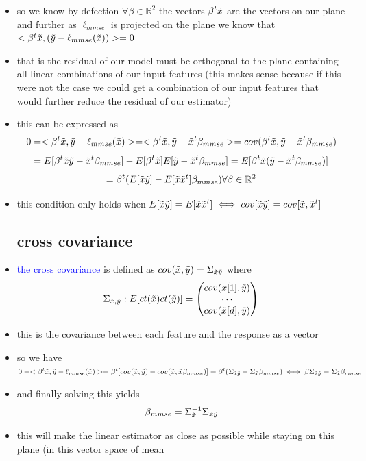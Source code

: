 \documentclass{article}
\begin{document}
\begin{itemize}
\item so we know by defection $\forall \beta \in \mathbb{R}^{2}$ the vectors $\beta^t\Tilde{x}$ are the vectors on our plane 
and further as $\ell_{mmse}$ is projected on the plane we know that $<\beta^t\Tilde{x}, (\Tilde{y}-\ell_{mmse}(\Tilde{x}))>=0$
\item that is the residual of our model must be orthogonal to the plane containing all linear combinations of our input 
features (this makes sense because if this were not the case we could get a combination of our input features that would
further reduce the residual of our estimator)
\item this can be expressed as $$0=<\beta^t\Tilde{x}, \Tilde{y}-\ell_{mmse}(\Tilde{x})>=
<\beta^t\Tilde{x}, \Tilde{y}-\Tilde{x}^t\beta_{mmse}>=cov(\beta^t\Tilde{x}, \Tilde{y}-\Tilde{x}^t\beta_{mmse})$$
$$=E[\beta^t\Tilde{x} \Tilde{y}-\Tilde{x}^t\beta_{mmse}]-E[\beta^t\Tilde{x}] E[\Tilde{y}-\Tilde{x}^t\beta_{mmse}]
=E[\beta^t\Tilde{x}(\Tilde{y}-\Tilde{x}^t\beta_{mmse})]$$ $$=\beta^t(E[\Tilde{x}\Tilde{y}]-E[\Tilde{x}\Tilde{x}^t]\beta_{mmse})\forall \beta \in \mathbb{R}^2$$
\item this condition only holds when $E[\Tilde{x}\Tilde{y}]=E[\Tilde{x}\Tilde{x}^t]\iff cov[\Tilde{x}\Tilde{y}]=cov[\Tilde{x} ,\Tilde{x}^t]$
\subsection*{cross covariance}
\item \textcolor{blue}{the cross covariance} is defined as $cov(\Tilde{x}, \Tilde{y})=\Sigma_{\Tilde{x}\Tilde{y}}$ where 
$$\Sigma_{\Tilde{x}, \Tilde{y}}:E[ct(\Tilde{x})ct(\Tilde{y})]=\begin{pmatrix}
    cov(\Tilde{x[1]}, \Tilde{y})\\ \cdots \\ cov(\Tilde{x}[d], \tilde{y})
\end{pmatrix}$$
\item this is the covariance between each feature and the response as a vector 
\item so we have $0=<\beta^t\Tilde{x}, \tilde{y}-\ell_{mmse}(\Tilde{x})>=\beta^t[cov(\Tilde{x}, \Tilde{y}) - cov(\Tilde{x},\Tilde{x} \beta_{mmse})]=\beta^t(\Sigma_{\Tilde{x}\Tilde{y}}-\Sigma_{\Tilde{x}} \beta_{mmse})\iff \beta\Sigma_{\Tilde{x}\Tilde{y}}=\Sigma_{\Tilde{x}}\beta_{mmse}$
\item and finally solving this yields $$\beta_{mmse}=\Sigma_{\Tilde{x}}^{-1}\Sigma_{\Tilde{x}\Tilde{y}}$$
\item this will make the linear estimator as close as possible while staying on this plane (in this vector space of mean 


\end{itemize}
\end{document}
